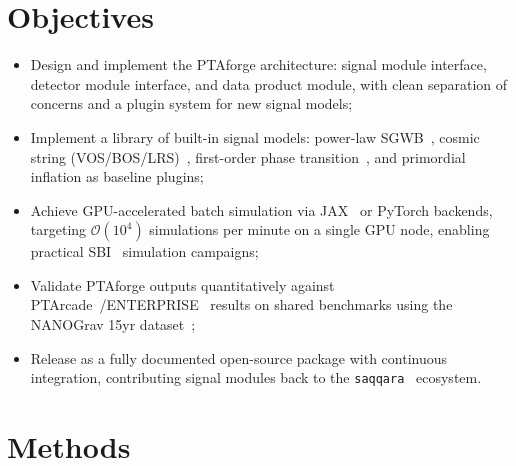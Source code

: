 \section{Objectives}\label{sec:3-objectives}
\begin{itemize}
    \item Design and implement the PTAforge architecture: signal module interface, detector module interface, and data product module, with clean separation of concerns and a plugin system for new signal models;
    \item Implement a library of built-in signal models: power-law SGWB~\cite{renzini_stochastic_2022}, cosmic string (VOS/BOS/LRS)~\cite{martins_extending_2002,blanco-pillado_number_2014,lorenz_cosmic_2010}, first-order phase transition~\cite{caprini_detecting_2020}, and primordial inflation as baseline plugins;
    \item Achieve GPU-accelerated batch simulation via JAX~\cite{bradbury_jax_2018} or PyTorch backends, targeting $\mathcal{O}(10^4)$ simulations per minute on a single GPU node, enabling practical SBI~\cite{cranmer_frontier_2020} simulation campaigns;
    \item Validate PTAforge outputs quantitatively against PTArcade~\cite{mitridate_ptarcade_2023a}/ENTERPRISE~\cite{ellis_enterprise_2020} results on shared benchmarks using the NANOGrav 15yr dataset~\cite{afzal_nanograv_2023,johnson_nanograv_2024};
    \item Release as a fully documented open-source package with continuous integration, contributing signal modules back to the \texttt{saqqara}~\cite{alvey_simulationbased_2024} ecosystem.
\end{itemize}

\section{Methods}\label{sec:3-methods}

